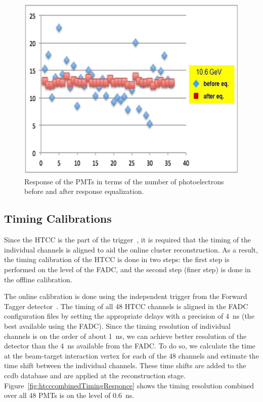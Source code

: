 \begin{figure}[ht]
\centering
\includegraphics[width=0.99\linewidth]{images/NICK_svodni.jpg}
\caption{Response of the PMTs in terms of the number of photoelectrons before and after response equalization.}
\label{fig:NICK_svodni}
\end{figure}

\subsection{Timing Calibrations}

Since the HTCC is the part of the trigger~\cite{trigger-nim}, it is required that the timing of the individual
channels is aligned to aid the online cluster reconstruction. As a result, the timing calibration of the HTCC is done
in two steps: the first step is performed on the level of the FADC, and the second step (finer step) is done in the
offline calibration.

The online calibration is done using the independent trigger from the Forward Tagger detector~\cite{ft-nim}. The
timing of all 48 HTCC channels is aligned in the FADC configuration files by setting the appropriate delays with a
precision of 4~ns (the best available using the FADC). Since the timing resolution of individual channels is on the
order of about 1~ns, we can achieve better resolution of the detector than the 4~ns available from the FADC. To do
so, we calculate the time at the beam-target interaction vertex for each of the 48 channels and estimate the time
shift between the individual channels. These time shifts are added to the ccdb database and are applied at the
reconstruction stage. Figure~\ref{fig:htcccombinedTimingResponce} shows the timing resolution combined over all
48 PMTs is on the level of 0.6~ns.


